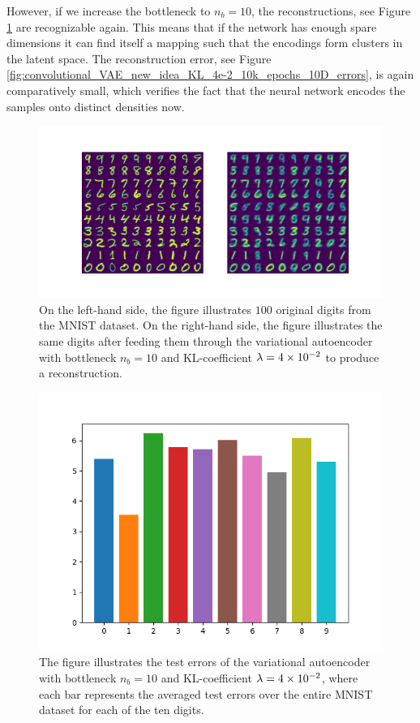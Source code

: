 However, if we increase the bottleneck to $n_b=10$, the reconstructions, see Figure \ref{fig:convolutional_VAE_snd_KL_4e-2_10k_epochs_10D_inference} are recognizable again. This means that if the network has enough \glqq spare dimensions\grqq{} it can find itself a mapping such that the encodings form clusters in the latent space. The reconstruction error, see Figure \ref{fig:convolutional_VAE_new_idea_KL_4e-2_10k_epochs_10D_errors}, is again comparatively small, which verifies the fact that the neural network encodes the samples onto distinct densities now.

\begin{figure}
\begin{center}
      \includegraphics[trim = 15mm 10mm 15mm 15mm, clip, width=\linewidth]{convolutional_VAE_snd_KL_4e-2_10k_epochs_10D_inference}
\end{center}
\caption{On the left-hand side, the figure illustrates $100$ original digits from the MNIST dataset. On the right-hand side, the figure illustrates the same digits after feeding them through the variational autoencoder with bottleneck $n_b=10$ and KL-coefficient $\lambda=\num{4e-2}$ to produce a reconstruction.}\label{fig:convolutional_VAE_snd_KL_4e-2_10k_epochs_10D_inference}
\end{figure}


\begin{figure}
\begin{center}
      \includegraphics[width=0.55\linewidth]{convolutional_VAE_snd_KL_4e-2_10k_epochs_10D_errors}
\end{center}
\caption{The figure illustrates the test errors of the variational autoencoder with bottleneck $n_b=10$ and KL-coefficient $\lambda = \num{4e-2}$, where each bar represents the averaged test errors over the entire MNIST dataset for each of the ten digits.}\label{fig:convolutional_VAE_snd_KL_4e-2_10k_epochs_10D_errors}
\end{figure}


